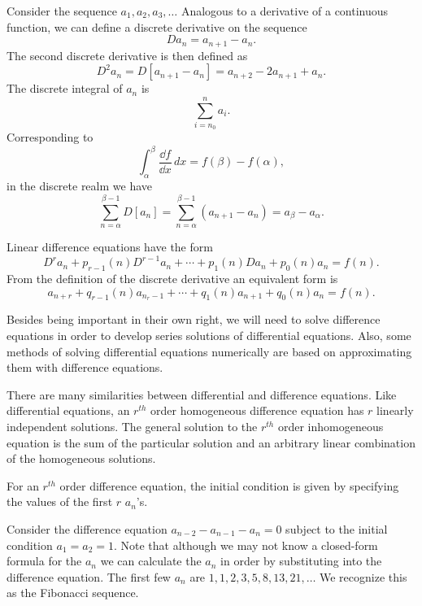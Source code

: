 Consider the sequence $a_1, a_2, a_3, \ldots$ Analogous to a derivative of
a continuous function, we can define a discrete derivative on the sequence
\[      D a_n = a_{n+1} - a_n. \]
The second discrete derivative is then defined as
\[      D^2a_n = D[a_{n+1} - a_n] = a_{n+2} - 2 a_{n+1} + a_n. \]
The discrete integral of $a_n$ is
\[      \sum_{i=n_0}^n a_i. \]
Corresponding to
\[ \int_\alpha^\beta \frac{\dd f}{\dd x}\,dx = f(\beta) - f(\alpha),\]
in the discrete realm we have
\[ \sum_{n=\alpha}^{\beta-1} D[a_n] = \sum_{n=\alpha}^{\beta-1} (a_{n+1}-a_n)
= a_\beta - a_\alpha. \]

Linear difference equations have the form 
\[ D^r a_n + p_{r-1}(n) D^{r-1}a_n + \cdots + p_1(n)D a_n + p_0(n)a_n = f(n).\]
From the definition of the discrete derivative an equivalent form is
\[ a_{n+r} + q_{r-1}(n) a_{n_r-1} + \cdots + q_1(n)a_{n+1} + q_0(n)a_n=f(n).\]

Besides being important in their own right, we will need to solve
difference equations in order to develop series solutions of 
differential equations.  Also, some methods of solving differential equations
numerically are based on approximating them with difference equations.

There are many similarities between differential and difference equations.
Like differential equations, an $r^{t h}$ order homogeneous difference 
equation has $r$ linearly independent solutions.  The general solution
to the $r^{t h}$ order inhomogeneous equation is the sum of the 
particular solution and an arbitrary linear combination of the homogeneous
solutions.  

For an $r^{t h}$ order difference equation, the initial condition is given
by specifying the values of the first $r$ $a_n$'s.



\begin{Example}
  Consider the difference equation $a_{n-2} - a_{n-1} - a_n = 0$ subject to
  the initial condition $a_1 = a_2 = 1$.  Note that although we may not 
  know a closed-form formula for the $a_n$ we can calculate the $a_n$ in 
  order by substituting into the difference equation.  The first few $a_n$ are
  $1, 1, 2, 3, 5, 8, 13, 21, \ldots$  We recognize this as the 
  Fibonacci sequence.  
\end{Example}





